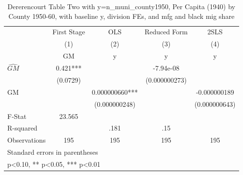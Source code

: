 \begin{table}[htbp]\centering
\def\sym#1{\ifmmode^{#1}\else\(^{#1}\)\fi}
\caption{Dererencourt Table Two with y=n\_muni\_county1950, Per Capita (1940) by County 1950-60, with baseline y, division FEs, and mfg and black mig share}
\begin{tabular}{l*{4}{c}}
\toprule
                    & First Stage   &         OLS   &Reduced Form   &        2SLS   \\
                    &\multicolumn{1}{c}{(1)}&\multicolumn{1}{c}{(2)}&\multicolumn{1}{c}{(3)}&\multicolumn{1}{c}{(4)}\\
                    &\multicolumn{1}{c}{GM}&\multicolumn{1}{c}{y}&\multicolumn{1}{c}{y}&\multicolumn{1}{c}{y}\\
\midrule
$\hat{GM}$          &       0.421***&               &   -7.94e-08   &               \\
                    &    (0.0729)   &               &(0.000000273)   &               \\
\addlinespace
GM                  &               & 0.000000660***&               &-0.000000189   \\
                    &               &(0.000000248)   &               &(0.000000643)   \\
\midrule
F-Stat              &      23.565   &               &               &               \\
R-squared           &               &        .181   &         .15   &               \\
Observations        &         195   &         195   &         195   &         195   \\
\bottomrule
\multicolumn{5}{l}{\footnotesize Standard errors in parentheses}\\
\multicolumn{5}{l}{\footnotesize * p<0.10, ** p<0.05, *** p<0.01}\\
\end{tabular}
\end{table}
